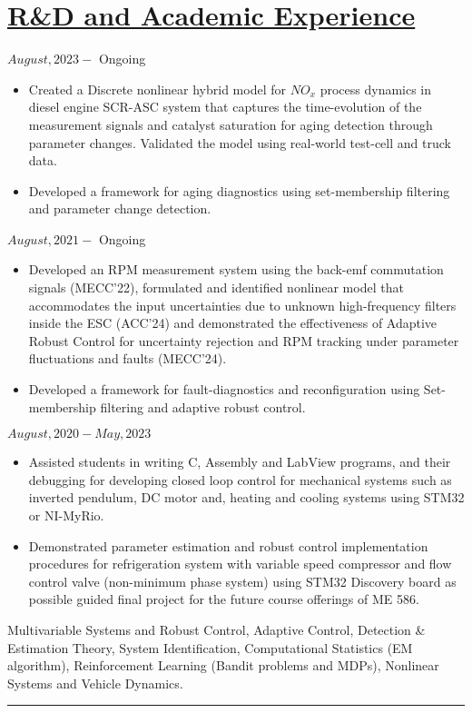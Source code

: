 \section*{\underline{R\&D and Academic Experience}}
\noindent {} \hfill $August, 2023 - $ Ongoing
\begin{itemize}
        \item Created a Discrete nonlinear hybrid model for $NO_x$ process dynamics in diesel engine SCR-ASC system that captures the time-evolution of the measurement signals and catalyst saturation for aging detection through parameter changes. Validated the model using real-world test-cell and truck data.
        \item Developed a framework for aging diagnostics using set-membership filtering and parameter change detection.
\end{itemize}

\medskip

\noindent {} \hfill $August, 2021 - $ Ongoing
\begin{itemize}
        \item Developed an RPM measurement system using the back-emf commutation signals (MECC'22), formulated and identified nonlinear model that accommodates the input uncertainties due to unknown high-frequency filters inside the ESC (ACC'24) and demonstrated the effectiveness of Adaptive Robust Control for uncertainty rejection and RPM tracking under parameter fluctuations and faults (MECC'24).
        \item Developed a framework for fault-diagnostics and reconfiguration using Set-membership filtering and adaptive robust control.
\end{itemize}

\medskip

\noindent {} \hfill $August, 2020 - May, 2023$
\begin{itemize}
        \item Assisted students in writing C, Assembly and LabView programs, and their debugging for developing closed loop control for mechanical systems such as inverted pendulum, DC motor and, heating and cooling systems using STM32 or NI-MyRio.

        \item {} Demonstrated parameter estimation and robust control implementation procedures for refrigeration system with variable speed compressor and flow control valve (non-minimum phase system) using STM32 Discovery board as possible guided final project for the future course offerings of ME 586.
\end{itemize}
\medskip
 Multivariable Systems and Robust Control, Adaptive Control, Detection \& Estimation Theory, System Identification, Computational Statistics (EM algorithm), Reinforcement Learning (Bandit problems and MDPs), Nonlinear Systems and Vehicle Dynamics.


\noindent\rule{\textwidth}{0.4pt}
